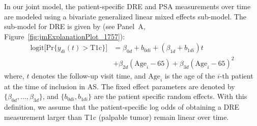 
In our joint model, the patient-specific DRE and PSA measurements over time are modeled using a bivariate generalized linear mixed effects sub-model. The sub-model for DRE is given by (see Panel~A, Figure~\ref{fig:jmExplanationPlot_1757}):
\begin{equation}
\label{eq:long_model_dre}
\begin{split}
    \mbox{logit} \big[\mbox{Pr}\{y_{di}(t) > \mbox{T1c}\}\big] &= \beta_{0d} + b_{0di} + (\beta_{1d} + b_{1di}) t\\
    &+ \beta_{2d} (\mbox{Age}_i-65) + \beta_{3d} (\mbox{Age}_i-65)^2
    \end{split}
\end{equation}
where, $t$ denotes the follow-up visit time, and $\mbox{Age}_i$ is the age of the ${i\mbox{-th}}$ patient at the time of inclusion in AS. The fixed effect parameters are denoted by ${\{\beta_{0d}, \ldots, \beta_{3d}\}}$, and ${\{b_{0di}, b_{1di}\}}$ are the patient specific random effects. With this definition, we assume that the patient-specific log odds of obtaining a DRE measurement larger than T1c (palpable tumor) remain linear over time. 

